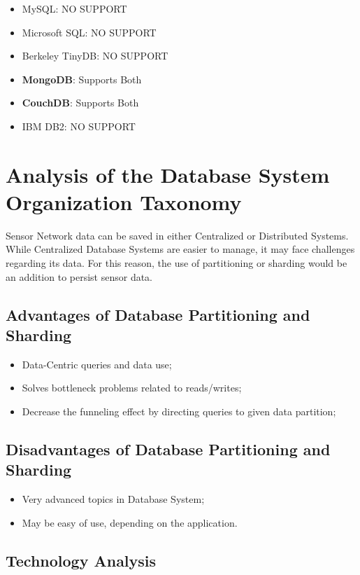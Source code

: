 \begin{itemize}
  \item MySQL: NO SUPPORT
  \item Microsoft SQL: NO SUPPORT
  \item Berkeley TinyDB: NO SUPPORT
  \item \textbf{MongoDB}: Supports Both
  \item \textbf{CouchDB}: Supports Both
  \item IBM DB2: NO SUPPORT
\end{itemize}

\section{Analysis of the Database System Organization Taxonomy}

Sensor Network data can be saved in either Centralized or Distributed Systems.
While Centralized Database Systems are easier to manage, it may face challenges
regarding its data. For this reason, the use of partitioning or sharding would
be an addition to persist sensor data.

\subsection{Advantages of Database Partitioning and Sharding}

\begin{itemize}
  \item Data-Centric queries and data use;
  \item Solves bottleneck problems related to reads/writes;
  \item Decrease the funneling effect by directing queries to given data
  partition;
\end{itemize}

\subsection{Disadvantages of Database Partitioning and Sharding}

\begin{itemize}
  \item Very advanced topics in Database System;
  \item May be easy of use, depending on the application.
\end{itemize}

\subsection{Technology Analysis}

